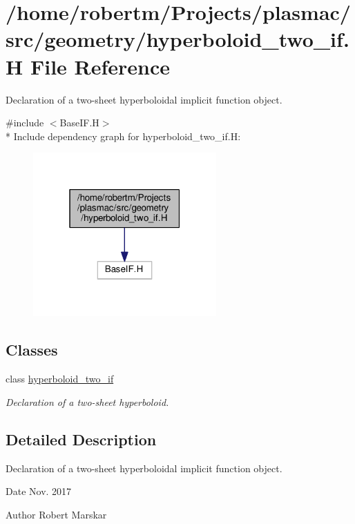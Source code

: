 \hypertarget{hyperboloid__two__if_8H}{}\section{/home/robertm/\+Projects/plasmac/src/geometry/hyperboloid\+\_\+two\+\_\+if.H File Reference}
\label{hyperboloid__two__if_8H}


Declaration of a two-\/sheet hyperboloidal implicit function object.  


{\ttfamily \#include $<$Base\+I\+F.\+H$>$}\\*
Include dependency graph for hyperboloid\+\_\+two\+\_\+if.\+H\+:\nopagebreak
\begin{figure}[H]
\begin{center}
\leavevmode
\includegraphics[width=199pt]{hyperboloid__two__if_8H__incl}
\end{center}
\end{figure}
\subsection*{Classes}
\begin{DoxyCompactItemize}
\item 
class \hyperlink{classhyperboloid__two__if}{hyperboloid\+\_\+two\+\_\+if}
\begin{DoxyCompactList}\small\item\em Declaration of a two-\/sheet hyperboloid. \end{DoxyCompactList}\end{DoxyCompactItemize}


\subsection{Detailed Description}
Declaration of a two-\/sheet hyperboloidal implicit function object. 

\begin{DoxyDate}{Date}
Nov. 2017 
\end{DoxyDate}
\begin{DoxyAuthor}{Author}
Robert Marskar 
\end{DoxyAuthor}
